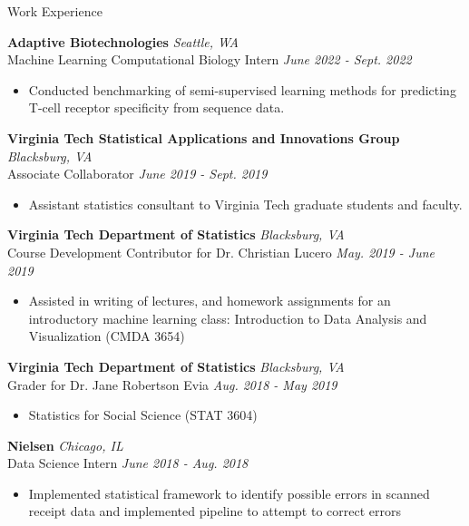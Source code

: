 \documentclass{resume} %
\begin{document}

\begin{rSection}{Work Experience}

{\bf Adaptive Biotechnologies} \hfill {\em Seattle, WA} \\
{Machine Learning Computational Biology Intern} \hfill {\em June 2022 - Sept. 2022}
\begin{itemize}
    \item Conducted benchmarking of semi-supervised learning methods for predicting T-cell receptor specificity from sequence data.
\end{itemize}

{\bf Virginia Tech Statistical Applications and Innovations Group} \hfill {\em Blacksburg, VA} \\
{Associate Collaborator} \hfill {\em June 2019 - Sept. 2019}
\begin{itemize}
    \item Assistant statistics consultant to Virginia Tech graduate students and faculty.
\end{itemize}

{\bf Virginia Tech Department of Statistics} \hfill {\em Blacksburg, VA} \\
{Course Development Contributor for Dr. Christian Lucero} \hfill {\em May. 2019 - June 2019}
\begin{itemize}
    \item Assisted in writing of lectures, and homework assignments for an introductory machine learning class: Introduction to Data Analysis and Visualization (CMDA 3654)
\end{itemize}

{\bf Virginia Tech Department of Statistics} \hfill {\em Blacksburg, VA} \\
{Grader for Dr. Jane Robertson Evia} \hfill {\em Aug. 2018 - May 2019}
\begin{itemize}
    \item Statistics for Social Science (STAT 3604)
\end{itemize}

{\bf Nielsen} \hfill {\em Chicago, IL} \\
{Data Science Intern} \hfill {\em June 2018 - Aug. 2018}
\begin{itemize}
    \item Implemented statistical framework to identify possible errors in scanned receipt data and implemented pipeline to attempt to correct errors
    \end{itemize}


\end{rSection}
\end{document}
